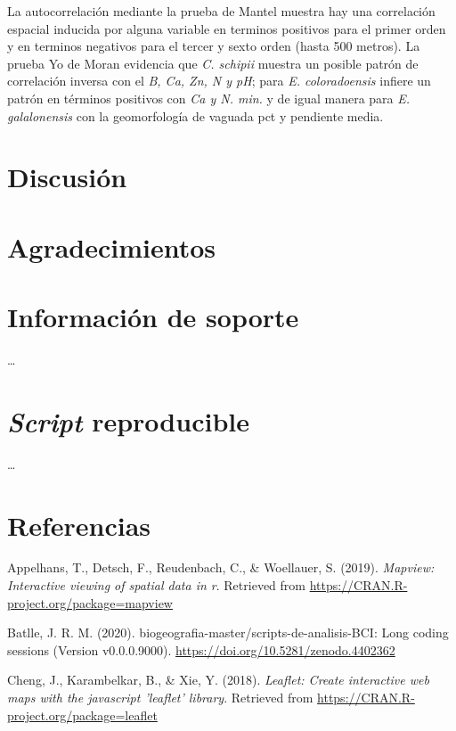 \documentclass[11pt,]{article}
\begin{document}
La autocorrelación mediante la prueba de Mantel muestra hay una
correlación espacial inducida por alguna variable en terminos positivos
para el primer orden y en terminos negativos para el tercer y sexto
orden (hasta 500 metros). La prueba Yo de Moran evidencia que \emph{C.
schipii} muestra un posible patrón de correlación inversa con el
\emph{B, Ca, Zn, N y pH}; para \emph{E. coloradoensis} infiere un patrón
en términos positivos con \emph{Ca y N. min.} y de igual manera para
\emph{E. galalonensis} con la geomorfología de vaguada pct y pendiente
media.

\section{Discusión}\label{discusiuxf3n}

\section{Agradecimientos}\label{agradecimientos}

\section{Información de soporte}\label{informaciuxf3n-de-soporte}

\ldots

\section{\texorpdfstring{\emph{Script}
reproducible}{Script reproducible}}\label{script-reproducible}

\ldots

\section*{Referencias}\label{referencias}

\hypertarget{refs}{}
\hypertarget{ref-mapview}{}
Appelhans, T., Detsch, F., Reudenbach, C., \& Woellauer, S. (2019).
\emph{Mapview: Interactive viewing of spatial data in r}. Retrieved from
\url{https://CRAN.R-project.org/package=mapview}

\hypertarget{ref-jose_ramon_martinez_batlle_2020_4402362}{}
Batlle, J. R. M. (2020). biogeografia-master/scripts-de-analisis-BCI:
Long coding sessions (Version v0.0.0.9000).
\url{https://doi.org/10.5281/zenodo.4402362}

\hypertarget{ref-leaflet}{}
Cheng, J., Karambelkar, B., \& Xie, Y. (2018). \emph{Leaflet: Create
interactive web maps with the javascript 'leaflet' library}. Retrieved
from \url{https://CRAN.R-project.org/package=leaflet}
\end{document}
